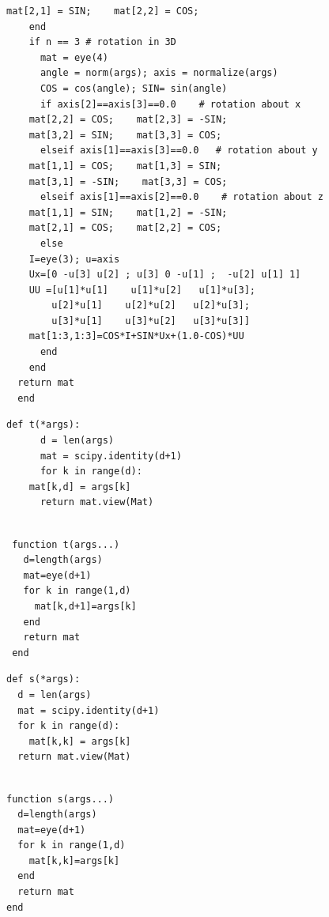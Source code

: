 \documentclass[a4paper,12pt]{article}
\begin{document}
\begin{multicols}{2}
\begin{Verbatim}[fontsize=\scriptsize]
      mat[2,1] = SIN;    mat[2,2] = COS;
    end
    if n == 3 # rotation in 3D
      mat = eye(4)
      angle = norm(args); axis = normalize(args)
      COS = cos(angle); SIN= sin(angle)
      if axis[2]==axis[3]==0.0    # rotation about x
	mat[2,2] = COS;    mat[2,3] = -SIN;
	mat[3,2] = SIN;    mat[3,3] = COS;
      elseif axis[1]==axis[3]==0.0   # rotation about y
	mat[1,1] = COS;    mat[1,3] = SIN;
	mat[3,1] = -SIN;    mat[3,3] = COS;
      elseif axis[1]==axis[2]==0.0    # rotation about z
	mat[1,1] = SIN;    mat[1,2] = -SIN;
	mat[2,1] = COS;    mat[2,2] = COS;
      else
	I=eye(3); u=axis
	Ux=[0 -u[3] u[2] ; u[3] 0 -u[1] ;  -u[2] u[1] 1]
	UU =[u[1]*u[1]    u[1]*u[2]   u[1]*u[3];
	    u[2]*u[1]    u[2]*u[2]   u[2]*u[3];
	    u[3]*u[1]    u[3]*u[2]   u[3]*u[3]]
	mat[1:3,1:3]=COS*I+SIN*Ux+(1.0-COS)*UU
      end
    end
  return mat
  end
\end{Verbatim}
\end{multicols}
\begin{multicols}{2}
\begin{Verbatim}[fontsize=\scriptsize]
    def t(*args):
      d = len(args)
      mat = scipy.identity(d+1)
      for k in range(d):
	mat[k,d] = args[k]
      return mat.view(Mat)   
\end{Verbatim}
\columnbreak
{}
\begin{Verbatim}[fontsize=\scriptsize]

 function t(args...)
   d=length(args)
   mat=eye(d+1)
   for k in range(1,d)
     mat[k,d+1]=args[k]
   end
   return mat
 end

\end{Verbatim}
\end{multicols}
\noindent {}
\begin{multicols}{2}
\noindent {}
\begin{Verbatim}[fontsize=\scriptsize]
def s(*args):
  d = len(args)
  mat = scipy.identity(d+1)
  for k in range(d):
    mat[k,k] = args[k]
  return mat.view(Mat)
    
\end{Verbatim}
\columnbreak
{}
\begin{Verbatim}[fontsize=\scriptsize]
function s(args...)
  d=length(args)
  mat=eye(d+1)
  for k in range(1,d)
    mat[k,k]=args[k]
  end
  return mat
end
\end{Verbatim}
\end{multicols}
\end{document}
